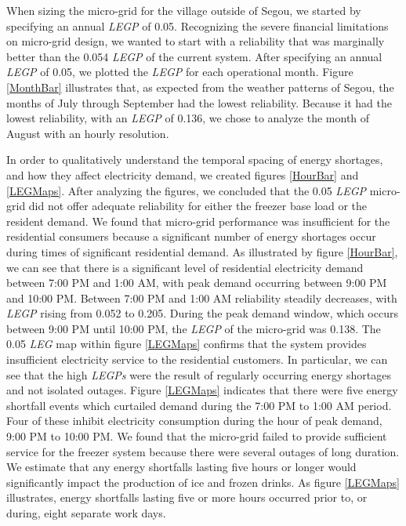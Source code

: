 \documentclass[11p]{article}
\begin{document}


When sizing the micro-grid for the village outside of Segou, we started by specifying an annual \emph{LEGP} of 0.05.
Recognizing the severe financial limitations on micro-grid design, we wanted to start with a reliability that was marginally better than the 0.054 \emph{LEGP} of the current system.
After specifying an annual \emph{LEGP} of 0.05, we plotted the \emph{LEGP} for each operational month. 
Figure \ref{MonthBar} illustrates that, as expected from the weather patterns of Segou, the months of July through September had the lowest reliability.  
Because it had the lowest reliability, with an \emph{LEGP} of 0.136, we chose to analyze the month of August with an hourly resolution. 

 
In order to qualitatively understand the temporal spacing of energy shortages, and how they affect electricity demand, we created figures \ref{HourBar} and \ref{LEGMaps}.
After analyzing the figures, we concluded that the 0.05 \emph{LEGP} micro-grid did not offer adequate reliability for either the freezer base load or the resident demand.
We found that micro-grid performance was insufficient for the residential consumers because a significant number of energy shortages occur during times of significant residential demand.
As illustrated by figure \ref{HourBar}, we can see that there is a significant level of residential electricity demand between 7:00 PM and 1:00 AM, with peak demand occurring between 9:00 PM and 10:00 PM.
Between 7:00 PM and 1:00 AM reliability steadily decreases, with \emph{LEGP} rising from 0.052 to 0.205. 
During the peak demand window, which occurs between 9:00 PM until 10:00 PM, the \emph{LEGP} of the micro-grid was 0.138.
The 0.05 \emph{LEG} map within figure \ref{LEGMaps} confirms that the system provides insufficient electricity service to the residential customers. 
In particular, we can see that the high \emph{LEGPs} were the result of regularly occurring energy shortages and not isolated outages.
Figure \ref{LEGMaps} indicates that there were five energy shortfall events which curtailed demand during the 7:00 PM to 1:00 AM period.
Four of these inhibit electricity consumption during the hour of peak demand, 9:00 PM to 10:00 PM.
We found that the micro-grid failed to provide sufficient service for the freezer system because there were several outages of long duration.
We estimate that any energy shortfalls lasting five hours or longer would significantly impact the production of ice and frozen drinks. 
As figure \ref{LEGMaps} illustrates, energy shortfalls lasting five or more hours occurred prior to, or during, eight separate work days.
 
\end{document}
